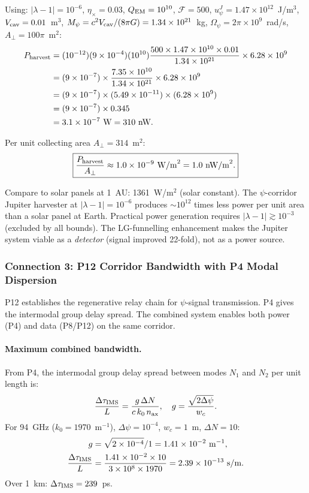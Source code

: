 \documentclass[aps,prd,twocolumn,superscriptaddress,nofootinbib]{revtex4-2}
\newcommand{\Opsi}{\Omega_\psi}
\begin{document}
Using: $|\lambda-1| = 10^{-6}$, $\eta_\times = 0.03$,
$Q_{\rm EM} = 10^{10}$, $\mathcal{F} = 500$,
$u_\psi^J = 1.47 \times 10^{12}$~J/m$^3$, $V_{\rm cav} = 0.01$~m$^3$,
$M_\psi = c^2 V_{\rm cav}/(8\pi G) = 1.34 \times 10^{21}$~kg,
$\Opsi = 2\pi \times 10^9$~rad/s, $A_\perp = 100\pi$~m$^2$:
\begin{align}
P_{\rm harvest} &= (10^{-12})(9\times10^{-4})(10^{10})
\frac{500\times 1.47\times10^{10}\times 0.01}
{1.34\times10^{21}} \times 6.28\times10^9 \notag\\
&= (9\times10^{-7})\times\frac{7.35\times10^{10}}{1.34\times10^{21}}
\times 6.28\times10^9 \notag\\
&= (9\times10^{-7})\times(5.49\times10^{-11})\times(6.28\times10^9) \notag\\
&= (9\times10^{-7})\times 0.345 \notag\\
&= 3.1\times10^{-7}~\text{W} = 310~\text{nW}.
\end{align}

Per unit collecting area $A_\perp = 314$~m$^2$:
\begin{equation}
\boxed{
\frac{P_{\rm harvest}}{A_\perp} \approx 1.0 \times 10^{-9}~\text{W/m}^2
= 1.0~\text{nW/m}^2.
}
\end{equation}

Compare to solar panels at 1~AU: 1361~W/m$^2$ (solar constant).  The
$\psi$-corridor Jupiter harvester at $|\lambda-1|=10^{-6}$ produces
$\sim 10^{12}$ times less power per unit area than a solar panel at Earth.
Practical power generation requires $|\lambda-1| \gtrsim 10^{-3}$ (excluded
by all bounds).  The LG-funnelling enhancement makes the Jupiter system
viable as a \emph{detector} (signal improved 22-fold), not as a power source.

\subsubsection{Connection 3: P12 Corridor Bandwidth with P4 Modal Dispersion}

P12 establishes the regenerative relay chain for $\psi$-signal transmission.
P4 gives the intermodal group delay spread.  The combined system enables both
power (P4) and data (P8/P12) on the same corridor.

\paragraph{Maximum combined bandwidth.}
From P4, the intermodal group delay spread between modes $N_1$ and $N_2$ per
unit length is:
\begin{equation}
\frac{\Delta\tau_{\rm IMS}}{L}
= \frac{g\,\Delta N}{c\,k_0\,n_{\rm ax}},
\quad g = \frac{\sqrt{2\Delta\psi}}{w_c}.
\label{eq:ims}
\end{equation}
For 94~GHz ($k_0 = 1970$~m$^{-1}$), $\Delta\psi = 10^{-4}$, $w_c = 1$~m,
$\Delta N = 10$:
\begin{align}
g &= \sqrt{2\times10^{-4}}/1 = 1.41\times10^{-2}~\text{m}^{-1}, \\
\frac{\Delta\tau_{\rm IMS}}{L}
&= \frac{1.41\times10^{-2}\times 10}
{3\times10^8 \times 1970} = 2.39\times10^{-13}~\text{s/m}.
\end{align}
Over 1~km: $\Delta\tau_{\rm IMS} = 239$~ps.
\end{document}
